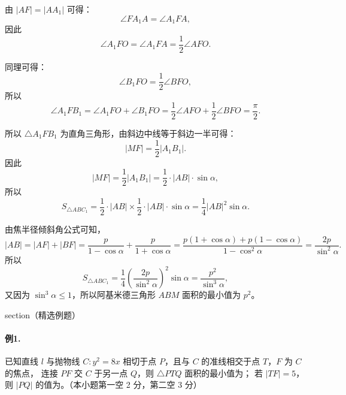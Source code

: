 \documentclass{ctexart}
\begin{document}
	由 $|AF|=|AA_1|$ 可得：
	\[
	\angle FA_1A=\angle A_1FA,
	\]
	因此
	\[
	\angle A_1FO=\angle A_1FA=\frac12\angle AFO.
	\]
	
	同理可得：
	\[
	\angle B_1FO=\frac12\angle BFO,
	\]
	所以
	\[
	\angle A_1FB_1=\angle A_1FO+\angle B_1FO
	=\frac12\angle AFO+\frac12\angle BFO=\frac{\pi}{2}.
	\]
	
	所以 $\triangle A_1FB_1$ 为直角三角形，由斜边中线等于斜边一半可得：
	\[
	|MF|=\frac12|A_1B_1|.
	\]
	因此
	\[
	|MF|=\frac12|A_1B_1|=\frac12\cdot|AB|\cdot\sin\alpha,
	\]
	所以
	\[
	S_{\triangle ABC_1}
	=\frac12\cdot|AB|\times \frac12\cdot|AB|\cdot\sin\alpha
	=\frac14|AB|^2\sin\alpha.
	\]
	
	由焦半径倾斜角公式可知，
	\[
	|AB|=|AF|+|BF|
	=\frac{p}{1-\cos\alpha}+\frac{p}{1+\cos\alpha}
	=\frac{p(1+\cos\alpha)+p(1-\cos\alpha)}{1-\cos^2\alpha}
	=\frac{2p}{\sin^2\alpha}.
	\]
	所以
	\[
	S_{\triangle ABC_1}
	=\frac14\left(\frac{2p}{\sin^2\alpha}\right)^2\sin\alpha
	=\frac{p^2}{\sin^3\alpha},
	\]
	又因为 $\sin^3\alpha\le 1$，所以阿基米德三角形 $ABM$ 面积的最小值为 $p^2$。
	
	\*section{（精选例题）}
	
	\paragraph{例1.}
	已知直线 $l$ 与抛物线 $C: y^2=8x$ 相切于点 $P$，且与 $C$ 的准线相交于点 $T$，$F$ 为 $C$ 的焦点，
	连接 $PF$ 交 $C$ 于另一点 $Q$，则 $\triangle PTQ$ 面积的最小值为\underline{\qquad}；
	若 $|TF|=5$，则 $|PQ|$ 的值为\underline{\qquad}。（本小题第一空 2 分，第二空 3 分）
	
\end{document}

